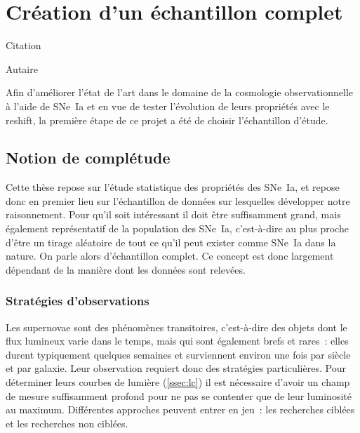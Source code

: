 \documentclass[../main/main.tex]{subfiles}
\begin{document}
\chapter{Cr\'eation d'un \'echantillon complet}\label{ch:sample}

\epigraph{Citation}{Autaire}
Afin d'améliorer l'état de l'art dans le domaine de la cosmologie
observationnelle à l'aide de SNe~Ia et en vue de tester l'évolution de leurs
propriétés avec le reshift, la première étape de ce projet a été de choisir
l'échantillon d'étude.

\vfill
\minitoc
\vfill
\newpage

\section{Notion de complétude}\label{sec:compl}


Cette thèse repose sur l'étude statistique des propriétés des SNe~Ia, et repose
donc en premier lieu sur l'échantillon de données sur lesquelles développer
notre raisonnement. Pour qu'il soit intéressant il doit être suffisamment grand,
mais également représentatif de la population des SNe~Ia, c'est-à-dire au plus
proche d'être un tirage aléatoire de tout ce qu'il peut exister comme SNe~Ia
dans la nature. On parle alors d'échantillon complet. Ce concept est donc
largement dépendant de la manière dont les données sont relevées.

\subsection{Stratégies d'observations}\label{ssec:startobs}

Les supernovae sont des phénomènes transitoires, c'est-à-dire des objets dont le
flux lumineux varie dans le temps, mais qui sont également brefs et rares~:
elles durent typiquement quelques semaines et surviennent environ une fois par
siècle et par galaxie. Leur observation requiert donc des stratégies
particulières. Pour déterminer leurs courbes de lumière (\ref{ssec:lc}) il est
nécessaire d'avoir un champ de mesure suffisamment profond pour ne pas se
contenter que de leur luminosité au maximum. Différentes approches peuvent
entrer en jeu~: les recherches ciblées et les recherches non ciblées.
\end{document}
